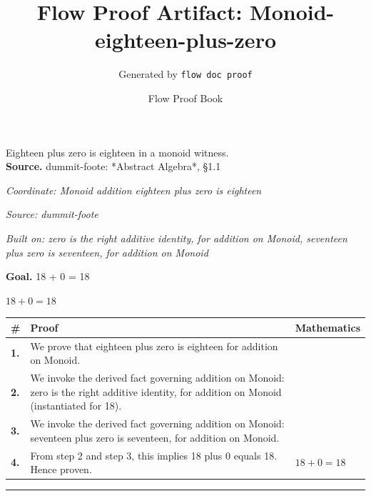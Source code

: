 \documentclass[11pt]{article}
\title{Flow Proof Artifact: Monoid-eighteen-plus-zero}
\author{Generated by \texttt{flow doc proof}}
\date{Flow Proof Book}
\theoremstyle{definition}
\begin{document}
\maketitle
Eighteen plus zero is eighteen in a monoid witness.\\[0.5em]
\textbf{Source.} dummit-foote: *Abstract Algebra*, §1.1\\[0.5em]
\bigskip
{}\par
\smallskip\noindent\textit{Coordinate: Monoid \cdot addition \cdot eighteen plus zero is eighteen}\par
\smallskip\noindent\textit{Source: dummit-foote}\par
\smallskip\noindent\textit{Built on: zero is the right additive identity, for addition on Monoid, seventeen plus zero is seventeen, for addition on Monoid}\par
\medskip
\noindent\textbf{Goal.} 18 + 0 = 18\par
\noindent$\displaystyle 18 + 0 = 18$\par
\medskip
\noindent
\begin{tabular}{@{} >{\raggedright\arraybackslash}p{} >{\raggedright\arraybackslash}p{} >{\raggedleft\arraybackslash}p{} @{}}
\textbf{\#} & \textbf{Proof} & \textbf{Mathematics} \\
\midrule
\textbf{1.} & We prove that eighteen plus zero is eighteen for addition on Monoid. & \\[0.45em]
\textbf{2.} & We invoke the derived fact governing addition on Monoid: zero is the right additive identity, for addition on Monoid (instantiated for 18). & \\[0.45em]
\textbf{3.} & We invoke the derived fact governing addition on Monoid: seventeen plus zero is seventeen, for addition on Monoid. & \\[0.45em]
\textbf{4.} & From step 2 and step 3, this implies 18 plus 0 equals 18. Hence proven. & $\displaystyle 18 + 0 = 18$ \\[0.45em]
\bottomrule
\end{tabular}
\label{thm:Monoid-addition-eighteen_plus_zero_is_eighteen}
\par\medskip\hrule
\end{document}

